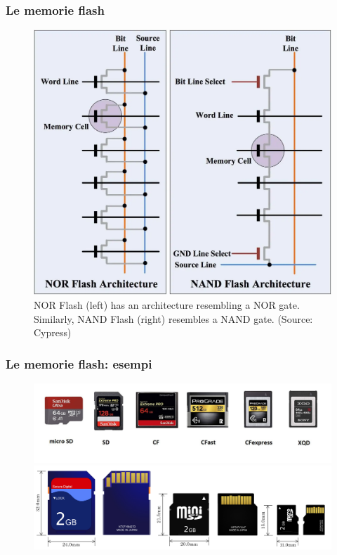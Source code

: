 \begin{frame}
	\frametitle{Le memorie flash}
	
	\begin{figure}[!htbp]
		\centering
		\includegraphics[width=0.57\linewidth]{images/5_memory/flash_nor_nand.png}
		\caption{NOR Flash (left) has an architecture resembling a NOR gate. Similarly, NAND Flash (right) resembles a NAND gate. (Source: Cypress)}
	\end{figure}
\end{frame}


\begin{frame}
	\frametitle{Le memorie flash: esempi}
	
	\begin{figure}[!htbp]
		\centering
		\includegraphics[width=1.0\linewidth]{images/5_memory/flash_1.jpg}
		\includegraphics[width=1.0\linewidth]{images/5_memory/flash_2.png}
	\end{figure}
\end{frame}

